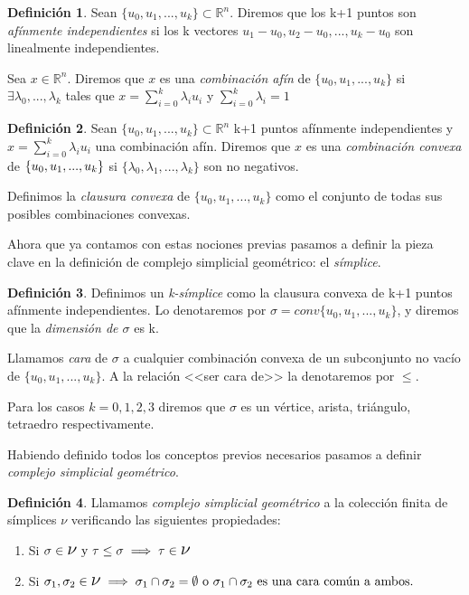 \documentclass[12pt, a4paper, twoside]{book}
\numberwithin{equation}{section}
\theoremstyle{definition}
\newtheorem{defi}{Definición}
\theoremstyle{remark}
\theoremstyle{plain}
\begin{document}
	\begin{defi}
		Sean $\{u_{0},u_{1},...,u_{k}\}\subset\mathbb{R}^{n}$. Diremos
		que los k+1 puntos son \textit{afínmente independientes} si 
		los k vectores $u_{1}-u_{0},u_{2}-u_{0},...,u_{k}-u_{0}$ son
		linealmente independientes.

		Sea $x \in \mathbb{R}^{n}$. Diremos que $x$ es una 
		\textit{combinación afín} de $\{u_{0},u_{1},...,u_{k}\}$ si 
		$\exists \lambda_{0},...,\lambda_{k}$ tales que 
		$x=\sum_{i=0}^{k}\lambda_{i}u_{i}$ y 
		$\sum_{i=0}^{k}\lambda_{i}=1$
	\end{defi}

	\begin{defi}
		Sean $\{u_{0},u_{1},...,u_{k}\}\subset\mathbb{R}^{n}$ k+1 
		puntos afínmente independientes y $x=\sum_{i=0}^{k}
		\lambda_{i}u_{i}$ una combinación afín. Diremos que $x$ es una
		\textit{combinación convexa} de $\{u_{0},u_{1},...,\\
		u_{k}\}$ si $\{\lambda_{0},\lambda_{1},...,\lambda_{k}\}$ son 
		no negativos.

		Definimos la \textit{clausura convexa} de $\{u_{0},u_{1},...,
		u_{k}\}$ como el conjunto de todas sus posibles combinaciones 
		convexas.
	\end{defi}

	Ahora que ya contamos con estas nociones previas pasamos a definir la 
	pieza clave en la definición de complejo simplicial geométrico: el 
	\emph{símplice}.

	\begin{defi}
		Definimos un \textit{k-símplice} como la clausura convexa de 
		k+1 puntos afínmente independientes. Lo denotaremos por 
		$\sigma=conv\{u_{0},u_{1},...,u_{k}\}$, y diremos que la 
		\textit{dimensión de $\sigma$} es k.

		Llamamos \textit{cara} de $\sigma$ a cualquier combinación 
		convexa de un subconjunto no vacío de $\{u_{0},u_{1},...,
		u_{k}\}$. A la relación <<ser cara de>> la denotaremos por 
		$\leq$.

		Para los casos $k=0,1,2,3$ diremos que $\sigma$ es un vértice,
		arista, triángulo, tetraedro respectivamente.
	\end{defi}

	Habiendo definido todos los conceptos previos necesarios pasamos a 
	definir \emph{complejo simplicial geométrico}.

	\begin{defi}
		Llamamos \textit{complejo simplicial geométrico} a la 
		colección finita de símplices {\Large $\nu$} verificando las
		siguientes propiedades:
		\begin{enumerate}
			\item Si $\sigma\in \text{{\Large $\nu$} y }
				\tau \leq \sigma \implies \tau \in 
				\text{{\Large $\nu$}}$
			\item Si $\sigma_{1},\sigma_{2} \in 
				\text{{\Large $\nu$}} \implies 
				\sigma_{1}\cap\sigma_{2}=\emptyset \text{ o }
				\sigma_{1}\cap\sigma_{2} \text{ es una cara 
				común a ambos.}$
		\end{enumerate}
	\end{defi}
	
\end{document}
